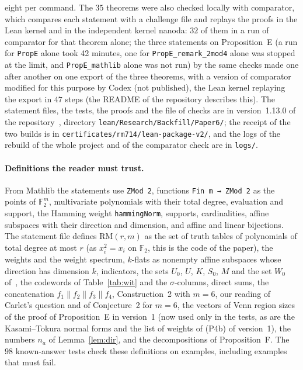 \documentclass[11pt]{article}
\theoremstyle{remark}
\newcommand{\F}{\mathbb F}
\newcommand{\RM}{\mathrm{RM}}
\newcommand{\cat}{\mathbin{\|}}
\newcommand{\repoversion}{1.13.0}
\begin{document}
eight per command. The $35$ theorems were also checked locally with
comparator, which compares each statement with a challenge file and replays
the proofs in the Lean kernel and in the independent kernel nanoda: $32$ of
them in a run of comparator for that theorem alone; the three statements on
Proposition~E (a run for \texttt{PropE} alone took 42 minutes, one for
\texttt{PropE\_remark\_2mod4} alone was stopped at the limit, and
\texttt{PropE\_mathlib} alone was not run) by the same checks made one after
another on one export of the three theorems, with a version of comparator
modified for this purpose by Codex (not published), the Lean kernel replaying
the export in $47$ steps (the README of the repository describes this).
The statement files, the tests, the proofs and the file of checks are in
version~\repoversion{} of the repository~\cite{repo}, directory
\texttt{lean/Research/Backfill/Paper6/}; the receipt of the two builds is in
\texttt{certificates/rm714/lean-package-v2/}, and the logs of the rebuild of
the whole project and of the comparator check are in \texttt{logs/}.

\paragraph{Definitions the reader must trust.}
From Mathlib the statements use \texttt{ZMod 2}, functions
\texttt{Fin m → ZMod 2} as the points of $\F_2^m$, multivariate polynomials with
their total degree, evaluation and support, the Hamming weight
\texttt{hammingNorm}, supports, cardinalities, affine subspaces with their
direction and dimension, and affine and linear bijections. The statement file
defines $\RM(r,m)$ as the set of truth tables of polynomials of total degree at
most $r$ (as $x_i^2=x_i$ on $\F_2$, this is the code of the paper), the weights
and the weight spectrum, $k$-flats as nonempty affine subspaces whose direction
has dimension $k$, indicators, the sets $U_0$, $U$, $K$, $S_0$, $M$ and the set
$W_0$ of~\cite[Proposition~4]{la}, the codewords of Table~\ref{tab:wit} and
the $\sigma$-columns, direct sums, the concatenation $f_1\cat f_2\cat f_3\cat
f_4$, Construction~2 with $m=6$, our reading of Carlet's question and of
Conjecture~2 for $m=6$, the vectors of Venn region sizes of the proof of
Proposition~E in version~1 (now used only in the tests, as are the
Kasami--Tokura normal forms and the list of weights of (P4b) of version~1), the
numbers $n_a$ of Lemma~\ref{lem:dir}, and the decompositions of
Proposition~F. The $98$ known-answer tests check these definitions on
examples, including examples that must fail.
\end{document}
